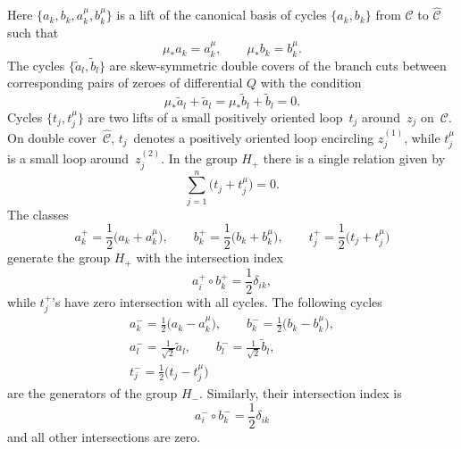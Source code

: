 \documentclass[pdftex]{sigma}
\numberwithin{equation}{section}
\theoremstyle{definition}
\begin{document}
Here
$\big\{ a_k, b_k, a^\mu_k, b^\mu_k \big\} $ is a lift of the canonical basis of cycles $\{ a_k ,b_k \}$ from $\mathcal{C}$ to $\hat{\mathcal{C}}$ such that
\begin{equation*}%
\mu_*a_k=a^\mu_k, \qquad \mu_*b_k=b^\mu_k.
\end{equation*}
The cycles $\big\{\tilde{a}_l, \tilde{b}_l\big\}$ are skew-symmetric double covers of the branch cuts between corresponding pairs of zeroes of differential $Q$ with the condition
\begin{equation*}
 \mu_*\tilde{a}_l+\tilde{a}_l=\mu_*\tilde{b}_l+\tilde{b}_l=0. \end{equation*}
Cycles $\big\{t_j, t_j^\mu \big\}$ are two lifts of a small positively oriented loop~$t_j$ around~$z_j$ on~$\mathcal{C}$. On double cover~$\hat{\mathcal{C}}$, $t_j$~denotes a positively oriented loop encircling $z^{(1)}_j$, while $t_j^\mu$ is a small loop around~$z^{(2)}_j$. In the group $H_{+}$ there is a single relation given by
\begin{equation*}%
\sum^{n}_{j=1}\big(t_j+t^\mu_j\big)=0. \end{equation*}
The classes
\begin{equation*}%
a^+_k=\frac{1}{2}\big(a_k+a^\mu_k\big), \qquad b^+_k=\frac{1}{2}\big(b_k+b^\mu_k\big), \qquad t^+_j=\frac{1}{2}\big(t_j+t^\mu_j\big)\end{equation*}
 generate the group $H_+$ with the intersection index
\begin{equation*}%
a^+_i \circ b^+_k=\frac{1}{2}\delta_{ik},
\end{equation*}
while $t^+_j$'s have zero intersection with all cycles.
The following cycles
\begin{gather}\label{32}a^-_k=\frac{1}{2}\big(a_k-a^\mu_k\big), \qquad b^-_k=\frac{1}{2}\big(b_k-b^\mu_k\big),\\
\label{33}a^-_l=\frac{1}{\sqrt{2}}\tilde{a}_l, \qquad b^-_l=\frac{1}{\sqrt{2}}\tilde{b}_l,\\
t^-_j=\frac{1}{2}\big(t_j-t^\mu_j\big)\nonumber
\end{gather}
are the generators of the group $H_-$. Similarly, their intersection index is
\begin{equation*}%
a^-_i \circ b^-_k=\frac{1}{2}\delta_{ik}
\end{equation*}
and all other intersections are zero.
\end{document}
